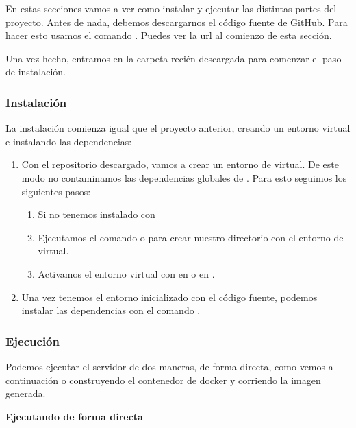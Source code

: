 En estas secciones vamos a ver como instalar y ejecutar las distintas partes del proyecto. Antes de nada, debemos descargarnos el código fuente de GitHub. Para hacer esto usamos el comando . Puedes ver la url al comienzo de esta sección.

Una vez hecho, entramos en la carpeta recién descargada para comenzar el paso de instalación.

\subsubsection{Instalación}

La instalación comienza igual que el proyecto anterior, creando un entorno virtual e instalando las dependencias:

\begin{enumerate}
  \item Con el repositorio descargado, vamos a crear un entorno de  virtual. De este modo no contaminamos las dependencias globales de . Para esto seguimos los siguientes pasos:
        \begin{enumerate}
          \item Si no tenemos instalado con 
          \item Ejecutamos el comando  o  para crear nuestro directorio  con el entorno de  virtual.
          \item Activamos el entorno virtual con  en  o  en .
        \end{enumerate}

  \item Una vez tenemos el entorno inicializado con el código fuente, podemos instalar las dependencias con el comando .
\end{enumerate}

\subsubsection{Ejecución}

Podemos ejecutar el servidor de dos maneras, de forma directa, como vemos a continuación o construyendo el contenedor de docker y corriendo la imagen generada.

\textbf{Ejecutando de forma directa}

